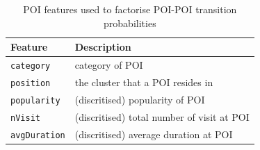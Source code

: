 \begin{table}[t]
\caption{POI features used to factorise POI-POI transition probabilities}
\label{tab:featuretran}
\centering
\begin{tabular}{l|l} \hline
\textbf{Feature}     & \textbf{Description} \\ \hline
\texttt{category}    & category of POI \\
\texttt{position}    & the cluster that a POI resides in \\
\texttt{popularity}  & (discritised) popularity of POI \\
\texttt{nVisit}      & (discritised) total number of visit at POI \\
\texttt{avgDuration} & (discritised) average duration at POI \\ \hline
\end{tabular}
\end{table}


